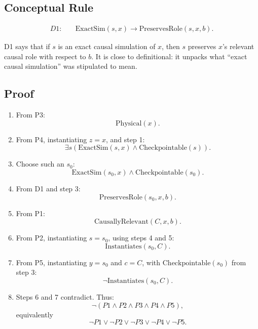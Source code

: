 \documentclass[11pt]{article}
\begin{document}
\subsection*{Conceptual Rule}

\begin{align*}
  D1:\quad & \mathrm{ExactSim}(s,x)\to \mathrm{PreservesRole}(s,x,b).
\end{align*}

\noindent
D1 says that if \(s\) is an exact causal simulation of \(x\), then \(s\)
preserves \(x\)'s relevant causal role with respect to \(b\). It is close to
definitional: it unpacks what ``exact causal simulation'' was stipulated to
mean.

\subsection*{Proof}

\begin{enumerate}
  \item From P3:
        \[
          \mathrm{Physical}(x).
        \]

  \item From P4, instantiating \(z=x\), and step 1:
        \[
          \exists s(\mathrm{ExactSim}(s,x)\land \mathrm{Checkpointable}(s)).
        \]

  \item Choose such an \(s_0\):
        \[
          \mathrm{ExactSim}(s_0,x)\land \mathrm{Checkpointable}(s_0).
        \]

  \item From D1 and step 3:
        \[
          \mathrm{PreservesRole}(s_0,x,b).
        \]

  \item From P1:
        \[
          \mathrm{CausallyRelevant}(C,x,b).
        \]

  \item From P2, instantiating \(s=s_0\), using steps 4 and 5:
        \[
          \mathrm{Instantiates}(s_0,C).
        \]

  \item From P5, instantiating \(y=s_0\) and \(c=C\), with
        \(\mathrm{Checkpointable}(s_0)\) from step 3:
        \[
          \neg \mathrm{Instantiates}(s_0,C).
        \]

  \item Steps 6 and 7 contradict. Thus:
        \[
          \neg(P1\land P2\land P3\land P4\land P5),
        \]
        equivalently
        \[
          \neg P1\lor \neg P2\lor \neg P3\lor \neg P4\lor \neg P5.
        \]
\end{enumerate}
\end{document}
